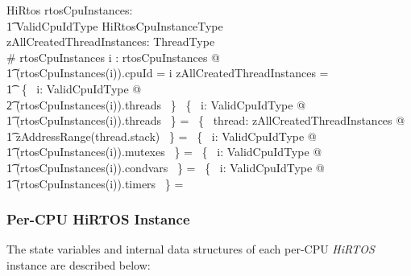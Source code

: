 \documentclass[11pt,letterpaper,twoside,openany]{book}
\begin{document}
\begin{schema}{HiRtos}
    rtosCpuInstances: \\
    \t1 ValidCpuIdType \inj HiRtosCpuInstanceType \\
    zAllCreatedThreadInstances: \finset ThreadType \\
\where
    \# rtosCpuInstances 
\also
    \forall i : \dom rtosCpuInstances @ \\
\t1   (rtosCpuInstances(i)).cpuId = i
\also
    zAllCreatedThreadInstances = \\
\t1    \bigcup~\{~ i: ValidCpuIdType @ \\
\t2    \ran (rtosCpuInstances(i)).threads ~\}
\also
    \bigcap~\{~ i: ValidCpuIdType @ \\
\t1    \ran (rtosCpuInstances(i)).threads ~\} = \emptyset
\also
    \bigcap~\{~ thread: zAllCreatedThreadInstances @ \\
\t1    zAddressRange(thread.stack) ~\} = \emptyset
\also
    \bigcap~\{~ i: ValidCpuIdType @ \\
\t1    \ran (rtosCpuInstances(i)).mutexes ~\} = \emptyset
\also
    \bigcap~\{~ i: ValidCpuIdType @ \\
\t1    \ran (rtosCpuInstances(i)).condvars ~\} = \emptyset
\also
    \bigcap~\{~ i: ValidCpuIdType @ \\
\t1    \ran (rtosCpuInstances(i)).timers ~\} = \emptyset
\end{schema}

\subsubsection{Per-CPU HiRTOS Instance}

The state variables and internal data structures of each per-CPU \emph{HiRTOS} instance
are described below:
\end{document}
